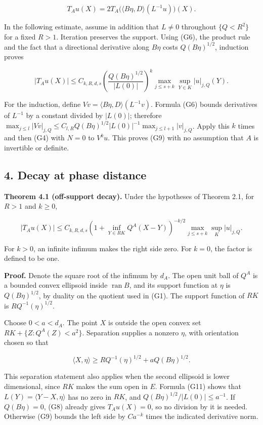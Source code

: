 \documentclass[
  11pt,
]{article}
\begin{document}
\[
T_Au(X)=2T_A\big(\langle B\eta,D\rangle(L^{-1}u)\big)(X).
                                                               \tag{G8}
\]

In the following estimate, assume in addition that \(L\ne0\) throughout
\(\{Q<R^2\}\) for a fixed \(R>1\). Iteration preserves the support.
Using (G6), the product rule and the fact that a directional derivative
along \(B\eta\) costs \(Q(B\eta)^{1/2}\), induction proves

\[
|T_Au(X)|
\leq C_{k,R,d,s}
\left(\frac{Q(B\eta)^{1/2}}{|L(0)|}\right)^k
\max_{j\leq s+k}\sup_{Y\in K}|u|_{j,Q}(Y).                    \tag{G9}
\]

For the induction, define \(Vv=\langle B\eta,D\rangle(L^{-1}v)\).
Formula (G6) bounds derivatives of \(L^{-1}\) by a constant divided by
\(|L(0)|\); therefore
\(\max_{j\leq l}|Vv|_{j,Q}\leq C_{l,R}Q(B\eta)^{1/2}|L(0)|^{-1}\max_{j\leq l+1}|v|_{j,Q}\).
Apply this \(k\) times and then (G4) with \(N=0\) to \(V^ku\). This
proves (G9) with no assumption that \(A\) is invertible or definite.

\subsection{4. Decay at phase distance}\label{decay-at-phase-distance}

\textbf{Theorem 4.1 (off-support decay).} Under the hypotheses of
Theorem 2.1, for \(R>1\) and \(k\geq0\),

\[
|T_Au(X)|\leq C_{k,R,d,s}
\left(1+\inf_{Y\in RK}Q^A(X-Y)\right)^{-k/2}
\max_{j\leq s+k}\sup_K|u|_{j,Q}.                              \tag{G10}
\]

For \(k>0\), an infinite infimum makes the right side zero. For \(k=0\),
the factor is defined to be one.

\textbf{Proof.} Denote the square root of the infimum by \(d_A\). The
open unit ball of \(Q^A\) is a bounded convex ellipsoid inside
\(\operatorname{ran}B\), and its support function at \(\eta\) is
\(Q(B\eta)^{1/2}\), by duality on the quotient used in (G1). The support
function of \(RK\) is \(R Q^{-1}(\eta)^{1/2}\).

Choose \(0<a<d_A\). The point \(X\) is outside the open convex set
\(RK+\{Z:Q^A(Z)<a^2\}\). Separation supplies a nonzero \(\eta\), with
orientation chosen so that

\[
\langle X,\eta\rangle
\geq RQ^{-1}(\eta)^{1/2}+aQ(B\eta)^{1/2}.                    \tag{G11}
\]

This separation statement also applies when the second ellipsoid is
lower dimensional, since \(RK\) makes the sum open in \(E\). Formula
(G11) shows that \(L(Y)=\langle Y-X,\eta\rangle\) has no zero in \(RK\),
and \(Q(B\eta)^{1/2}/|L(0)|\leq a^{-1}\). If \(Q(B\eta)=0\), (G8)
already gives \(T_Au(X)=0\), so no division by it is needed. Otherwise
(G9) bounds the left side by \(C a^{-k}\) times the indicated derivative
norm.
\end{document}
